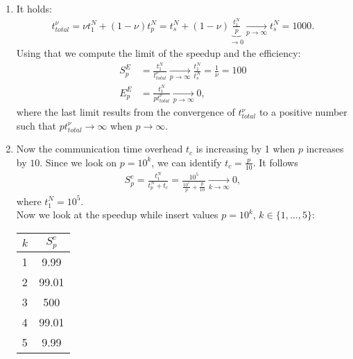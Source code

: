\documentclass{article}
\begin{document}
\begin{enumerate}[label=(\alph*)]
\item It holds: 
\begin{align*}
    t^{\nu}_{total} = \nu t_1^N + (1-\nu)t_p^N = t_s^N + (1-\nu)\underbrace{\frac{t_1^N}{p}}_{\to 0} \xrightarrow[p \to \infty]{} t_s^N=1000.
\end{align*}
Using that we compute the limit of the speedup and the efficiency:
\begin{align*}
    S_p^E &= \frac{t_1^N}{t_{total}^\nu}\xrightarrow[p \to \infty]{} \frac{t_1^N}{t_s^N}=\frac{1}{\nu}=100\\
    E_p^E &= \frac{t_1^N}{pt_{total}^\nu}\xrightarrow[p \to \infty]{}0,
\end{align*}
where the last limit results from the convergence of $t^\nu_{total}$ to a positive number such that $pt^\nu_{total}\to\infty$ when $p\to\infty$.
\item Now the communication time overhead $t_c$ is increasing by 1 when $p$ increases by $10$. Since we look on $p=10^k$, we can identify $t_c=\frac{p}{10}$.
It follows
\begin{align*}
    S^c_p = \frac{t_1^N}{t_p^N+t_c} = \frac{10^5}{\frac{10^5}{p} + \frac{p}{10}} \xrightarrow[k \to \infty]{} 0,
\end{align*}
where $t_1^N = 10^5$.\\
Now we look at the speedup while insert values $p=10^k$, $k\in\{1,\dots,5\}$:
    \begin{center}
\begin{tabular}{ l | c } 
  $k$ & $S_p^c$ \\
  \hline
  1 & 9.99 \\
  2 & 99.01 \\
  3 & 500 \\
  4 & 99.01 \\
  5 & 9.99 \\
\end{tabular}        
    \end{center}
\end{enumerate}
\end{document}
